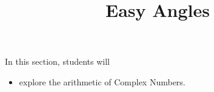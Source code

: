 \documentclass{ximera}
\title{Easy Angles}
\begin{document}
\begin{abstract}
\end{abstract}
\maketitle













\begin{sectionOutcomes}
In this section, students will 

\begin{itemize}
\item explore the arithmetic of Complex Numbers.
\end{itemize}
\end{sectionOutcomes}
\end{document}
